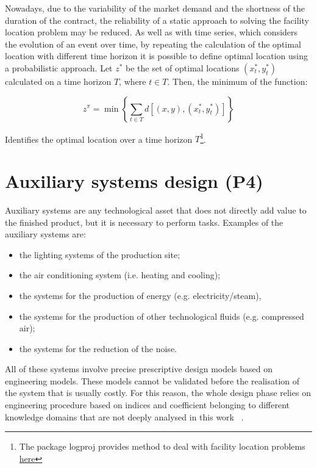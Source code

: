Nowadays, due to the variability of the market demand and the shortness of the duration of the contract, the reliability of a static approach to solving the facility location problem may be reduced. As well as with time series, which considers the evolution of an event over time, by repeating the calculation of the optimal location with different time horizon it is possible to define optimal location using a probabilistic approach. Let $z^\ast$ be the set of optimal locations $(x_t^\ast,y_t^\ast)$ calculated on a time horizon $T$, where $t\in T$. Then, the minimum of the function:

\begin{equation}
    z^\pi=\min{\left\{\sum_{t\in T} d\left[\left(x,y\right),\left(x_t^\ast,y_t^\ast\right)\right]\right\}}
\end{equation}

Identifies the optimal location over a time horizon $T$\footnote{The package logproj provides method to deal with facility location problems \href{https://github.com/aletuf93/logproj/blob/master/logproj/P6_placementProblem/facility_location_definition.py}{here}}.

\section{Auxiliary systems design (P4)}
Auxiliary systems are any technological asset that does not directly add value to the finished product, but it is necessary to perform tasks. Examples of the auxiliary systems are:

\begin{itemize}
    \item the lighting systems of the production site;
    \item the air conditioning system (i.e. heating and cooling);
    \item the systems for the production of energy (e.g. electricity/steam),
    \item the systems for the production of other technological fluids (e.g. compressed air);
    \item the systems for the reduction of the noise.

\end{itemize}

All of these systems involve precise prescriptive design models based on engineering models. These models cannot be validated before the realisation of the system that is usually costly. For this reason, the whole design phase relies on engineering procedure based on indices and coefficient belonging to different knowledge domains that are not deeply analysed in this work ~\cite{Colombo2012}.

